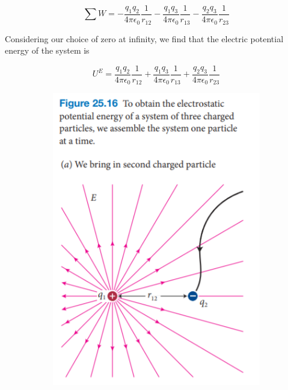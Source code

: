         \[
            \sum W = -\frac{q_1 q_2}{4\pi\epsilon_0} \frac{1}{r_{12}} - \frac{q_1 q_3}{4\pi\epsilon_0} \frac{1}{r_{13}} - \frac{q_2 q_3}{4\pi\epsilon_0} \frac{1}{r_{23}}
        \]

        Considering our choice of zero at infinity, we find that the electric potential energy of the system is

        \[
            U^E = \frac{q_1 q_2}{4\pi\epsilon_0} \frac{1}{r_{12}} + \frac{q_1 q_3}{4\pi\epsilon_0} \frac{1}{r_{13}} + \frac{q_2 q_3}{4\pi\epsilon_0} \frac{1}{r_{23}}
        \]

        \begin{figure}[hbt!]
            \centering
            \begin{subfigure}[b]{.45\textwidth}
                \includegraphics[scale = 0.75]{Resources/25.4_Multiple_Particles_1}
            \end{subfigure}
            \begin{subfigure}[b]{.45\textwidth}

\end{subfigure}
\end{figure}
